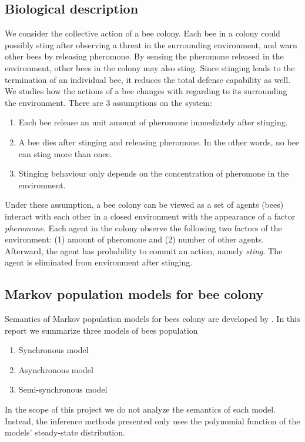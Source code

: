 \documentclass[12pt]{article}
\theoremstyle{definition}
\begin{document}
\subsection{Biological description}
We consider the collective action of a bee colony. Each bee in a colony could
possibly sting after observing a threat in the surrounding environment, and warn
other bees by releasing pheromone. By sensing the pheromone released in the
environment, other bees in the colony may also sting. Since stinging leads to
the termination of an individual bee, it reduces the total defense capability as
well. We studies how the actions of a bee changes with regarding to its
surrounding the environment. There are 3 assumptions on the system:
\begin{enumerate}
\item Each bee release an unit amount of pheromone immediately after stinging.
\item A bee dies after stinging and releasing pheromone. In the other words, no
  bee can sting more than once.
\item Stinging behaviour only depends on the concentration of pheromone in the
  environment.
\end{enumerate}
Under these assumption, a bee colony can be viewed as a set of agents (bees)
interact with each other in a closed environment with the appearance of a factor
\textit{pheromone}. Each agent in the colony observe the following two factors
of the environment: (1) amount of pheromone and (2) number of other agents.
Afterward, the agent has probability to commit an action, namely \textit{sting}.
The agent is eliminated from environment after stinging.

\subsection{Markov population models for bee colony}
Semantics of Markov population models for bees colony are developed by
\cite{hajnal2019data}. In this report we summarize three models of bees population
\begin{enumerate}
\item Synchronous model
\item Asynchronous model
\item Semi-synchronous model
\end{enumerate}
In the scope of this project we do not analyze the semantics of each model.
Instead, the inference methods presented only uses the polynomial function of
the models' steady-state distribution. 
\end{document}
